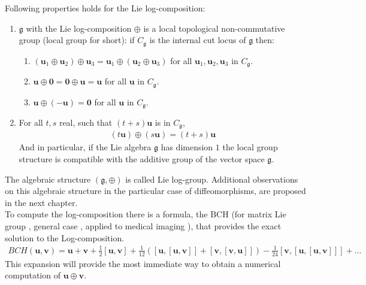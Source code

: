 \noindent
Following properties holds for the Lie log-composition:
\begin{enumerate}
	\item $\mathfrak{g} $ with the Lie log-composition $\oplus$ is a local topological non-commutative group (local group for short): if $C_{\mathfrak{g}}$ is the internal cut locus of $\mathfrak{g}$ then:
	\begin{enumerate}
		\item $(\mathbf{u}_{1}\oplus\mathbf{u}_{2}) \oplus \mathbf{u}_{3}
		= \mathbf{u}_{1}\oplus(\mathbf{u}_{2} \oplus \mathbf{u}_{3})$ for all $\mathbf{u}_{1}, \mathbf{u}_{2}, \mathbf{u}_{3}$ in $C_{\mathfrak{g}}$.
		\item $\mathbf{u}\oplus\mathbf{0}  = \mathbf{0}\oplus\mathbf{u} = \mathbf{u}$ for all $\mathbf{u}$ in $C_{\mathfrak{g}}$.
		\item $\mathbf{u}\oplus(-\mathbf{u} ) = \mathbf{0}$ for all $\mathbf{u}$ in $C_{\mathfrak{g}}$.
	\end{enumerate}
	\item For all $t,s$ real, such that $(t+s)\mathbf{u}$ is in $C_{\mathfrak{g}}$,
	\begin{align*}
	(t\mathbf{u})\oplus (s\mathbf{u}) = (t+s)\mathbf{u}
	\end{align*}
	And in particular, if the Lie algebra $\mathfrak{g}$ has dimension $1$ the local group structure is compatible with the additive group of the vector space $\mathfrak{g}$.
\end{enumerate}

\noindent
The algebraic structure $(\mathfrak{g} , \oplus)$ is called Lie log-group. Additional observations on this algebraic structure in the particular case of diffeomorphisms, are proposed in the next chapter.\\
To compute the log-composition there is a formula, the BCH (for matrix Lie group \cite{hall2015lie}, general case \cite{wojtynski1994one}, applied to medical imaging \cite{vercauteren08}), that provides the exact solution to the Log-composition. 
\begin{align*}
BCH(\mathbf{u},\mathbf{v}) 
= 
\mathbf{u} + \mathbf{v} + \frac{1}{2}[\mathbf{u},\mathbf{v}] + \frac{1}{12}([\mathbf{u},[\mathbf{u},\mathbf{v}]]
+ [\mathbf{v},[\mathbf{v},\mathbf{u}]]) - \frac{1}{24}[\mathbf{v},[\mathbf{u},[\mathbf{u},\mathbf{v}]]] +... 
\end{align*}
This expansion will provide the most immediate way to obtain a numerical computation of $\mathbf{u}\oplus \mathbf{v}$.

